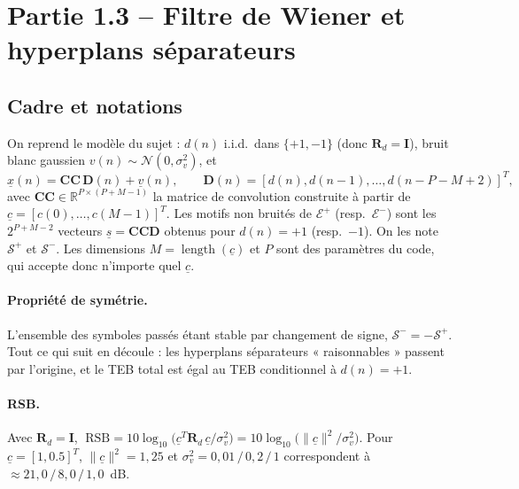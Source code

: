\newcommand{\E}{\mathbb{E}}
\newcommand{\Rx}{\bm{R}_{x}}
\newcommand{\CC}{\bm{C\!C}}
\newcommand{\x}{\underline{x}}
\newcommand{\w}{\underline{w}}
\newcommand{\conv}{\operatorname{conv}}
\newcommand{\sv}{\sigma_v^2}
\newcommand{\Qf}{\operatorname{Q}}


\section{Partie 1.3 -- Filtre de Wiener et hyperplans séparateurs}

\subsection{Cadre et notations}
\providecommand{\bm}[1]{\boldsymbol{#1}}
On reprend le modèle du sujet : $d(n)$ i.i.d.\ dans $\{+1,-1\}$ (donc $\bm{R}_d=\bm I$), bruit blanc gaussien $v(n)\sim\mathcal N(0,\sv)$, et
\begin{equation}
 \x(n)=\CC\,\bm D(n)+\underline v(n),\qquad
 \bm D(n)=[d(n),d(n-1),\dots,d(n-P-M+2)]^T ,
\end{equation}
avec $\CC\in\mathbb R^{P\times(P+M-1)}$ la matrice de convolution construite à partir de $\underline c=[c(0),\dots,c(M-1)]^T$. Les motifs non bruités de $\mathcal E^{+}$ (resp.\ $\mathcal E^{-}$) sont les $2^{P+M-2}$ vecteurs $\underline s=\CC\bm D$ obtenus pour $d(n)=+1$ (resp.\ $-1$). On les note $\mathcal S^{+}$ et $\mathcal S^{-}$. Les dimensions $M=\operatorname{length}(\underline c)$ et $P$ sont des paramètres du code, qui accepte donc n'importe quel $\underline c$.

\paragraph{Propriété de symétrie.} L'ensemble des symboles passés étant stable par changement de signe, $\mathcal S^{-}=-\mathcal S^{+}$. Tout ce qui suit en découle : les hyperplans séparateurs « raisonnables » passent par l'origine, et le TEB total est égal au TEB conditionnel à $d(n)=+1$.

\paragraph{RSB.} Avec $\bm R_d=\bm I$, $\;\mathrm{RSB}=10\log_{10}\!\big(\underline c^T\bm R_d\,\underline c/\sv\big)=10\log_{10}\!\big(\|\underline c\|^2/\sv\big)$. Pour $\underline c=[1,0.5]^T$, $\|\underline c\|^2=1{,}25$ et $\sv=0{,}01\,/\,0{,}2\,/\,1$ correspondent à $\approx 21{,}0\,/\,8{,}0\,/\,1{,}0$~dB.

